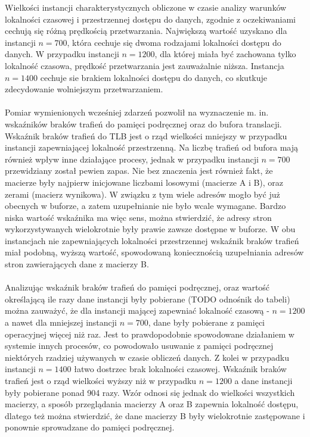 \documentclass[12pt,a4paper]{article}
\begin{document}
Wielkości instancji charakterystycznych obliczone w czasie analizy warunków lokalności czasowej i przestrzennej dostępu do danych, zgodnie z oczekiwaniami cechują się różną prędkością przetwarzania. Największą wartość uzyskano dla instancji $n=700$, która cechuje się dwoma rodzajami lokalności  dostępu do danych. W przypadku instancji $n=1200$, dla której miała być zachowana tylko lokalność czasowa, prędkość przetwarzania jest zauważalnie niższa. Instancja $n=1400$ cechuje sie brakiem lokalności dostępu do danych, co skutkuje zdecydowanie wolniejszym przetwarzaniem.\\
\\
Pomiar wymienionych wcześniej zdarzeń pozwolił na wyznaczenie m. in. wskaźników braków trafień do pamięci podręcznej oraz do bufora translacji. Wskaźnik braków trafień do TLB jest o rząd wielkości mniejszy w przypadku instancji zapewniającej lokalność przestrzenną. Na liczbę trafień od bufora mają również wpływ inne działające procesy, jednak w przypadku instancji $n=700$ przewidziany został pewien zapas. Nie bez znaczenia jest również fakt, że macierze były najpierw inicjowane liczbami losowymi (macierze A i B), oraz zerami (macierz wynikowa). W związku z tym wiele adresów mogło być już obecnych w buforze, a zatem uzupełnianie nie było wcale wymagane. Bardzo niska wartość wskaźnika ma więc sens, można stwierdzić, że adresy stron wykorzystywanych wielokrotnie były prawie zawsze dostępne w buforze. W obu instancjach nie zapewniających lokalności przestrzennej wskaźnik braków trafień miał podobną, wyższą wartość, spowodowaną koniecznością uzupełniania adresów stron zawierających dane z macierzy B.\\
\\
Analizując wskaźnik braków trafień do pamięci podręcznej, oraz wartość określającą ile razy dane instancji były pobierane (TODO odnośnik do tabeli) można zauważyć, że dla instancji mającej zapewniać lokalność czasową - $n=1200$ a nawet dla mniejszej instancji $n=700$, dane były pobierane z pamięci operacyjnej więcej niż raz. Jest to prawdopodobnie spowodowane działaniem w systemie innych procesów, co powodowało usuwanie z pamięci podręcznej niektórych rzadziej używanych w czasie obliczeń danych. Z kolei w przypadku instancji $n=1400$ łatwo dostrzec brak lokalności czasowej. Wskaźnik braków trafień jest o rząd wielkości wyższy niż w przypadku $n=1200$ a dane instancji były pobierane ponad 904 razy. Wzór odnosi się jednak do wielkości wszystkich macierzy, a sposób przeglądania macierzy A oraz B zapewnia lokalność dostępu, dlatego też można stwierdzić, że dane macierzy B były wielokrotnie zastępowane i ponownie sprowadzane do pamięci podręcznej.\\
\end{document}
